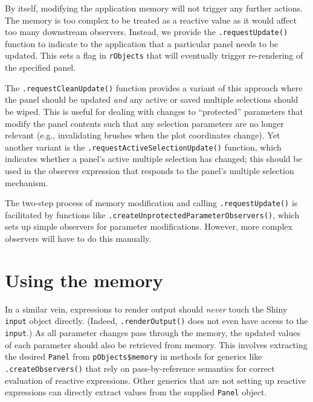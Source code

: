 \documentclass[
]{book}
\newenvironment{Shaded}{\begin{snugshade}}{\end{snugshade}}
\newcommand{\NormalTok}[1]{#1}
\newcommand{\OperatorTok}[1]{\textcolor[rgb]{0.81,0.36,0.00}{\textbf{#1}}}
\newcommand{\StringTok}[1]{\textcolor[rgb]{0.31,0.60,0.02}{#1}}
\begin{document}
\begin{Shaded}
\end{Shaded}

By itself, modifying the application memory will not trigger any further actions.
The memory is too complex to be treated as a reactive value as it would affect too many downstream observers.
Instead, we provide the \texttt{.requestUpdate()} function to indicate to the application that a particular panel needs to be updated.
This sets a flag in \texttt{rObjects} that will eventually trigger re-rendering of the specified panel.

The \texttt{.requestCleanUpdate()} function provides a variant of this approach where the panel should be updated \emph{and} any active or saved multiple selections should be wiped.
This is useful for dealing with changes to ``protected'' parameters that modify the panel contents such that any selection parameters are no longer relevant (e.g., invalidating brushes when the plot coordinates change).
Yet another variant is the \texttt{.requestActiveSelectionUpdate()} function, which indicates whether a panel's active multiple selection has changed; this should be used in the observer expression that responds to the panel's multiple selection mechanism.

The two-step process of memory modification and calling \texttt{.requestUpdate()} is facilitated by functions like \texttt{.createUnprotectedParameterObservers()}, which sets up simple observers for parameter modifications.
However, more complex observers will have to do this manually.

\hypertarget{using-the-memory}{%
\section{Using the memory}\label{using-the-memory}}

In a similar vein, expressions to render output should \emph{never} touch the Shiny \texttt{input} object directly.
(Indeed, \texttt{.renderOutput()} does not even have access to the \texttt{input}.)
As all parameter changes pass through the memory, the updated values of each parameter should also be retrieved from memory.
This involves extracting the desired \texttt{Panel} from \texttt{pObjects\$memory} in methods for generics like \texttt{.createObservers()} that rely on pass-by-reference semantics for correct evaluation of reactive expressions.
Other generics that are not setting up reactive expressions can directly extract values from the supplied \texttt{Panel} object.
\end{document}

